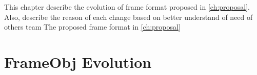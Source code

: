 This chapter describe the evolution of frame format proposed in \ref{ch:proposal}. Also, describe the reason
 of each change based on better understand of need of others team 
The proposed frame format in \ref{ch:proposal}

\section{FrameObj Evolution}

